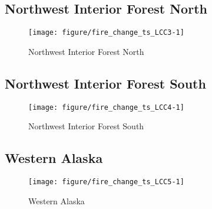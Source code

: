 \documentclass{article}\usepackage[]{graphicx}\usepackage[]{color}
\makeatletter
\def\maxwidth{ %
  \ifdim\Gin@nat@width>\linewidth
    \linewidth
  \else
    \Gin@nat@width
  \fi
}
\makeatother
\begin{document}
\subsection{Northwest Interior Forest North}
\begin{figure}[H]
\texttt{[image: figure/fire\_change\_ts\_LCC3-1]} \caption[Northwest Interior Forest North]{Northwest Interior Forest North}\label{fig:fire_change_ts_LCC3}
\end{figure}



\subsection{Northwest Interior Forest South}
\begin{figure}[H]
\texttt{[image: figure/fire\_change\_ts\_LCC4-1]} \caption[Northwest Interior Forest South]{Northwest Interior Forest South}\label{fig:fire_change_ts_LCC4}
\end{figure}



\subsection{Western Alaska}
\begin{figure}[H]
\texttt{[image: figure/fire\_change\_ts\_LCC5-1]} \caption[Western Alaska]{Western Alaska}\label{fig:fire_change_ts_LCC5}
\end{figure}
\end{document}

